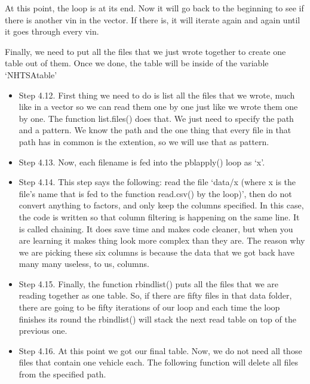 \documentclass[]{book}
\begin{document}
At this point, the loop is at its end. Now it will go back to the beginning to see if there is another vin in the vector. If there is, it will iterate again and again until it goes through every vin.

Finally, we need to put all the files that we just wrote together to create one table out of them. Once we done, the table will be inside of the variable `NHTSAtable'

\begin{itemize}
\item
  Step 4.12. First thing we need to do is list all the files that we wrote, much like in a vector so we can read them one by one just like we wrote them one by one. The function list.files() does that. We just need to specify the path and a pattern. We know the path and the one thing that every file in that path has in common is the extention, so we will use that as pattern.
\item
  Step 4.13. Now, each filename is fed into the pblapply() loop as `x'.
\item
  Step 4.14. This step says the following: read the file `data/x (where x is the file's name that is fed to the function read.csv() by the loop)', then do not convert anything to factors, and only keep the columns specified. In this case, the code is written so that column filtering is happening on the same line. It is called chaining. It does save time and makes code cleaner, but when you are learning it makes thing look more complex than they are. The reason why we are picking these six columns is because the data that we got back have many many useless, to us, columns.
\item
  Step 4.15. Finally, the function rbindlist() puts all the files that we are reading together as one table. So, if there are fifty files in that data folder, there are going to be fifty iterations of our loop and each time the loop finishes its round the rbindlist() will stack the next read table on top of the previous one.
\item
  Step 4.16. At this point we got our final table. Now, we do not need all those files that contain one vehicle each. The following function will delete all files from the specified path.
\end{itemize}
\end{document}
